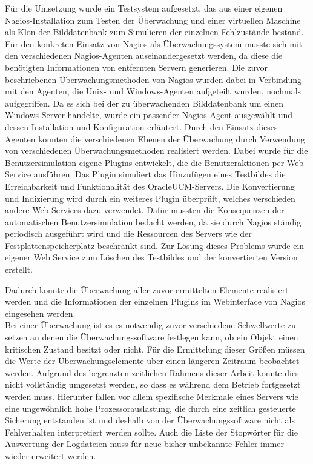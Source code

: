 Für die Umsetzung wurde ein Testsystem aufgesetzt, das aus einer eigenen Nagios-Installation zum Testen der Überwachung und einer virtuellen Maschine als Klon der Bilddatenbank zum Simulieren der einzelnen Fehlzustände bestand.
Für den konkreten Einsatz von Nagios als Überwachungssystem musste sich mit den verschiedenen Nagios-Agenten auseinandergesetzt werden, da diese die benötigten Informationen von entfernten Servern generieren.
Die zuvor beschriebenen Überwachungsmethoden von Nagios wurden dabei in Verbindung mit den Agenten, die Unix- und Windows-Agenten aufgeteilt wurden, nochmals aufgegriffen.
Da es sich bei der zu überwachenden Bilddatenbank um einen Windows-Server handelte, wurde ein passender Nagios-Agent ausgewählt und dessen Installation und Konfiguration erläutert.
Durch den Einsatz dieses Agenten konnten die verschiedenen Ebenen der Überwachung durch Verwendung von verschiedenen Überwachungsmethoden realisiert werden.
Dabei wurde für die Benutzersimulation eigene Plugins entwickelt, die die Benutzeraktionen per Web Service ausführen.
Das Plugin simuliert das Hinzufügen eines Testbildes die Erreichbarkeit und Funktionalität des \gls{OracleUCM}-Servers.
Die Konvertierung und Indizierung wird durch ein weiteres Plugin überprüft, welches verschieden andere Web Services dazu verwendet.
Dafür mussten die Konsequenzen der automatischen Benutzersimulation bedacht werden, da sie durch Nagios ständig periodisch ausgeführt wird und die Ressourcen des Servers wie der Festplattenspeicherplatz beschränkt sind.
Zur Lösung dieses Problems wurde ein eigener Web Service zum Löschen des Testbildes und der konvertierten Version erstellt.

Dadurch konnte die Überwachung aller zuvor ermittelten Elemente realisiert werden und die Informationen der einzelnen Plugins im Webinterface von Nagios eingesehen werden.\\

Bei einer Überwachung ist es es notwendig zuvor verschiedene Schwellwerte zu setzen an denen die Überwachungssoftware festlegen kann, ob ein Objekt einen kritischen Zustand besitzt oder nicht.
Für die Ermittelung dieser Größen müssen die Werte der Überwachungselemente über einen längeren Zeitraum beobachtet werden.
Aufgrund des begrenzten zeitlichen Rahmens dieser Arbeit konnte dies nicht vollständig umgesetzt werden, so dass es während dem Betrieb fortgesetzt werden muss.
Hierunter fallen vor allem spezifische Merkmale eines Servers wie eine ungewöhnlich hohe Prozessorauslastung, die durch eine zeitlich gesteuerte Sicherung entstanden ist und deshalb von der Überwachungssoftware nicht als Fehlverhalten interpretiert werden sollte.
Auch die Liste der Stopwörter für die Auswertung der Logdateien muss für neue bisher unbekannte Fehler immer wieder erweitert werden.

